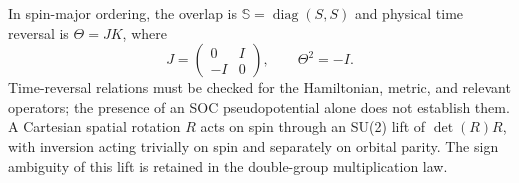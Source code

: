 In spin-major ordering, the overlap is
$\mathbb S=\operatorname{diag}(S,S)$ and physical time reversal is
$\Theta=JK$, where
\begin{equation}
 J=\begin{pmatrix}0&I\\-I&0\end{pmatrix},\qquad
 \Theta^2=-I .
\end{equation}
Time-reversal relations must be checked for the Hamiltonian, metric,
and relevant operators; the presence of an SOC pseudopotential alone
does not establish them.
A Cartesian spatial rotation $R$ acts on spin through an SU(2) lift of
$\det(R)R$, with inversion acting trivially on spin and separately on
orbital parity. The sign ambiguity of this lift is retained in the
double-group multiplication law.

